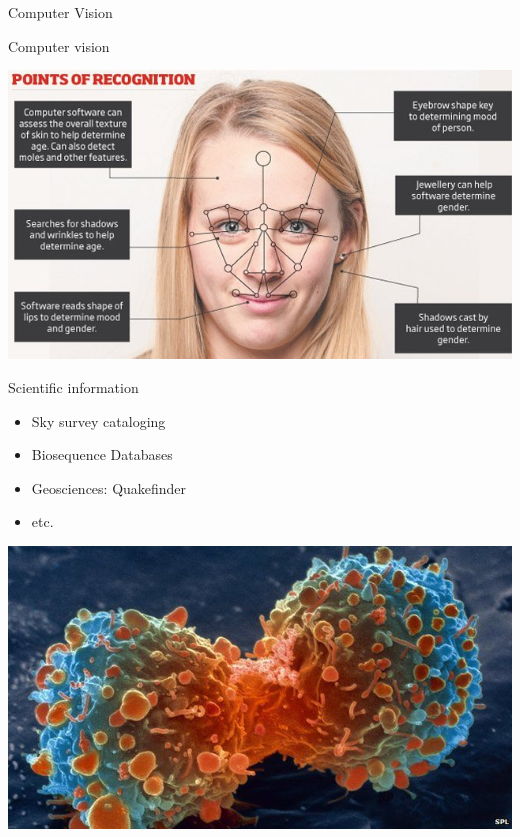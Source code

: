 \documentclass{beamer}
\begin{document}
\begin{frame}{Computer Vision}

Computer vision
  
\begin{center}
\includegraphics[width=.9\textwidth]{figs/FaceRecognition}
\end{center}

\end{frame}

\begin{frame}{Scientific information}

\begin{itemize}
 \item Sky survey cataloging
 \item Biosequence Databases
 \item Geosciences: Quakefinder
 \item etc.
\end{itemize}

\begin{center}
\includegraphics[width=.3\textwidth]{figs/bioinformatics}
\end{center}

\end{frame}
\end{document}
